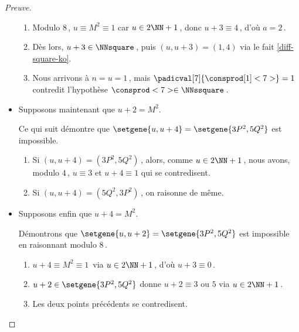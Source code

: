 \begin{proof}[Preuve]
\begin{itemize}
\begin{enumerate}
			\item Modulo $8$\,, $u \equiv M^2 \equiv 1$ car $u \in 2 \NN + 1$\,,
			donc $u + 3 \equiv 4$\,, d'où $a = 2$\,.

			\item Dès lors, $u + 3 \in \NNsquare$\,, puis $(u, u + 3) = (1, 4)$ via le fait \ref{diff-square-ko}.

			\item Nous arrivons à $n = u = 1$\,, mais $\padicval[7]{\consprod[1]<7>} = 1$ contredit l'hypothèse $\consprod<7> \in \NNssquare$\,.
		\end{enumerate}


    	\item Supposons maintenant que $u + 2 = M^2$.

		\smallskip
		\noindent
		Ce qui suit démontre que $\setgene{u, u + 4} = \setgene{3P^2, 5Q^2}$ est impossible.
		\begin{enumerate}
			\item Si $(u, u + 4) = (3P^2, 5Q^2)$\,, alors,
			comme $u \in 2 \NN + 1$\,, nous avons, modulo $4$\,,
			$u \equiv 3$
			et
			$u+4 \equiv 1$
			qui se contredisent.

			\item Si $(u, u + 4) = (5Q^2, 3P^2)$\,, on raisonne de même.
		\end{enumerate}


    	\item Supposons enfin que $u + 4 = M^2$.

		\smallskip
		\noindent
		Démontrons que $\setgene{u, u + 2} = \setgene{3P^2, 5Q^2}$ est impossible en raisonnant modulo $8$\,.
		\begin{enumerate}
			\item $u + 4 \equiv M^2 \equiv 1$\, via $u \in 2 \NN + 1$\,,
			d'où $u + 3 \equiv 0$\,.

			\item $u + 2 \in \setgene{3P^2, 5Q^2}$ donne $u + 2 \equiv \text{$3$ ou $5$}$  via $u \in 2 \NN + 1$\,.

			\item Les deux points précédents se contredisent. \qedhere
		\end{enumerate}
    \end{itemize}
\end{proof}

 